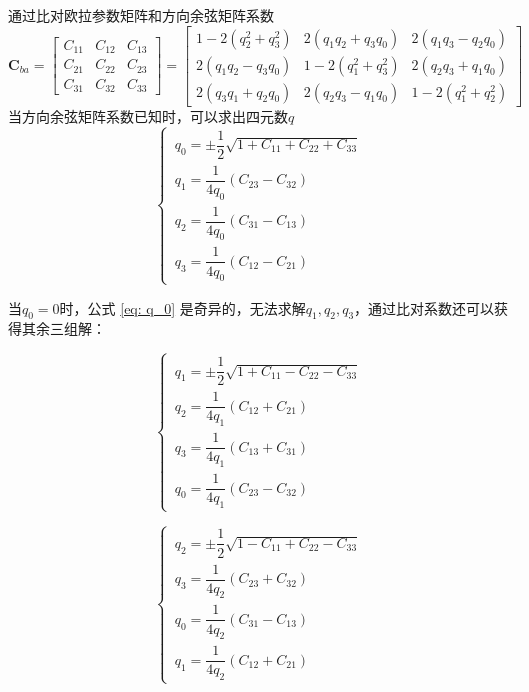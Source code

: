 \sssection[欧拉参数与方向余弦矩阵之间的转换]

通过比对欧拉参数矩阵和方向余弦矩阵系数
\begin{equation}
	\bm{C}_{ba} = 
	\begin{bmatrix}
		C_{11} & C_{12} & C_{13} \\
		C_{21} & C_{22} & C_{23} \\
		C_{31} & C_{32} & C_{33}
	\end{bmatrix}
	= 
	\begin{bmatrix}
		1 - 2(q_2^2 + q_3^2) & 2(q_1q_2 + q_3q_0) & 2(q_1q_3 - q_2q_0)\\
		2(q_1q_2 - q_3q_0)  & 1 - 2(q_1^2 + q_3^2) & 2(q_2q_3 + q_1q_0) \\
		2(q_3q_1 + q_2q_0)& 2(q_2q_3 - q_1q_0) & 1 - 2(q_1^2 + q_2^2)
	\end{bmatrix}
\end{equation}
当方向余弦矩阵系数已知时，可以求出四元数$q$
\begin{equation}
	\begin{cases}
		\, q_0 =  \pm \dfrac{1}{2} \sqrt{1 + C_{11} + C_{22} + C_{33}} \\[0.8em]
		\, q_1 = \dfrac{1}{4q_0}(C_{23} - C_{32}) \\[0.8em]
		\, q_2 = \dfrac{1}{4q_0}(C_{31} - C_{13}) \\[0.8em]
		\, q_3 = \dfrac{1}{4q_0}(C_{12} - C_{21})
	\end{cases}
	\label{eq: q_0}
\end{equation}

当$q_0 = 0$时，公式 \eqref{eq: q_0} 是奇异的，无法求解$q_1, q_2, q_3$，通过比对系数还可以获得其余三组解：

\begin{equation}
	\begin{cases}
		\, q_1 = \pm \dfrac{1}{2} \sqrt{1 + C_{11} - C_{22} - C_{33}} \\[0.8em]
		\, q_2 = \dfrac{1}{4q_1}(C_{12} + C_{21}) \\[0.8em]
		\, q_3 = \dfrac{1}{4q_1}(C_{13} + C_{31}) \\[0.8em]
		\, q_0 = \dfrac{1}{4q_1}(C_{23} - C_{32})
	\end{cases}
\end{equation}

\begin{equation}
	\begin{cases}
		\, q_2 = \pm \dfrac{1}{2} \sqrt{1 - C_{11} + C_{22} - C_{33}} \\[0.8em]
		\, q_3 = \dfrac{1}{4q_2}(C_{23} + C_{32}) \\[0.8em]
		\, q_0 = \dfrac{1}{4q_2}(C_{31} - C_{13}) \\[0.8em]
		\, q_1 = \dfrac{1}{4q_2}(C_{12} + C_{21})
	\end{cases}
\end{equation}

